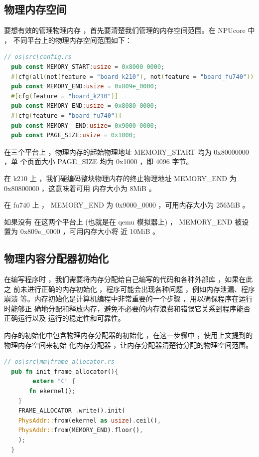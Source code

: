 	\subsection{物理内存空间}
	
	要想有效的管理物理内存 ，首先要清楚我们管理的内存空间范围。在 NPUcore 中 ，
	不同平台上的物理内存空间范围如下：
	
	\begin{lstlisting}[language=Rust]
  // os\src\config.rs
  pub const MEMORY_START:usize = 0x8000_0000;
  #[cfg(all(not(feature = "board_k210"), not(feature = "board_fu740")))]
  pub const MEMORY_END:usize = 0x809e_0000;
  #[cfg(feature = "board_k210")]
  pub const MEMORY_END:usize = 0x8080_0000;
  #[cfg(feature = "board_fu740")]
  pub const MEMORY_ END:usize= 0x9000_0000;
  pub const PAGE_SIZE:usize = 0x1000;
    \end{lstlisting}

	在三个平台上 ，物理内存的起始物理地址 MEMORY\_START 均为  0x80000000 ，单
	个页面大小 PAGE\_SIZE 均为 0x1000 ，即 4096 字节。
	
	在 k210 上 ，我们硬编码整块物理内存的终止物理地址 MEMORY\_END 为 0x80800000 ，这意味着可用 内存大小为  8MiB 。
	
	在 fu740 上 ，   MEMORY\_END 为  0x9000\_0000 ，可用内存大小为 256MiB 。
	
	如果没有 在这两个平台上  (也就是在 qemu 模拟器上)  ，   MEMORY\_END 被设
	置为  0x809e\_0000 ，可用内存大小将  近 10MiB 。	
	\subsection{物理内容分配器初始化}
	
	在编写程序时 ，我们需要将内存分配给自己编写的代码和各种外部库 ，如果在此之
	前未进行正确的内存初始化 ，程序可能会出现各种问题 ，例如内存泄漏、程序崩溃
	等。内存初始化是计算机编程中非常重要的一个步骤 ，用以确保程序在运行时能够正
	确地分配和释放内存，避免不必要的内存浪费和错误它关系到程序能否正确运行以及
	运行的稳定性和可靠性。
	
	内存的初始化中包含物理内存分配器的初始化 ，在这一步骤中 ，使用上文提到的
	物理内存空间来初始 化内存分配器 ，让内存分配器清楚待分配的物理空间范围。
	
	\begin{lstlisting}[language=Rust]
  // os\src\mm\frame_allocator.rs
  pub fn init_frame_allocator(){
    	extern "C" {
	   fn ekernel();
    }
    FRAME_ALLOCATOR .write().init(
    PhysAddr::from(ekernel as usize).ceil(),
    PhysAddr::from(MEMORY_END).floor(),
    );
  }
	\end{lstlisting}
	
